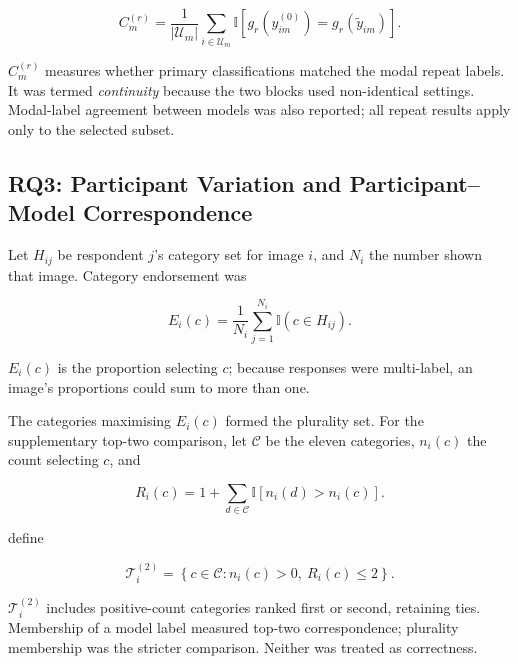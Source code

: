 \begin{equation}
C_m^{(r)}
=
\frac{1}{|\mathcal{U}_m|}
\sum_{i\in\mathcal{U}_m}
\mathbb{I}\!\left[
g_r(y_{im}^{(0)})
=
g_r(\widetilde{y}_{im})
\right].
\end{equation}

\(C_m^{(r)}\) measures whether primary classifications matched the modal repeat
labels. It was termed \textit{continuity} because the two blocks used
non-identical settings. Modal-label agreement between models was also reported;
all repeat results apply only to the selected subset.

\subsection{RQ3: Participant Variation and Participant--Model Correspondence}
\label{subsec:human_model_support}

Let \(H_{ij}\) be respondent \(j\)'s category set for image \(i\), and \(N_i\)
the number shown that image. Category endorsement was

\begin{equation}
    E_i(c)
    =
    \frac{1}{N_i}
    \sum_{j=1}^{N_i}
    \mathbb{I}\!\left(c\in H_{ij}\right).
\end{equation}

\(E_i(c)\) is the proportion selecting \(c\); because responses were
multi-label, an image's proportions could sum to more than one.

The categories maximising \(E_i(c)\) formed the plurality set. For the
supplementary top-two comparison, let \(\mathcal{C}\) be the eleven categories,
\(n_i(c)\) the count selecting \(c\), and

\begin{equation}
    R_i(c)
    =
    1+
    \sum_{d\in\mathcal{C}}
    \mathbb{I}\!\left[n_i(d)>n_i(c)\right].
\end{equation}

define

\begin{equation}
    \mathcal{T}_i^{(2)}
    =
    \left\{
        c\in\mathcal{C}:
        n_i(c)>0,
        \ R_i(c)\leq2
    \right\}.
\end{equation}

\(\mathcal{T}_i^{(2)}\) includes positive-count categories ranked first or
second, retaining ties. Membership of a model label measured top-two
correspondence; plurality membership was the stricter comparison. Neither was
treated as correctness.

